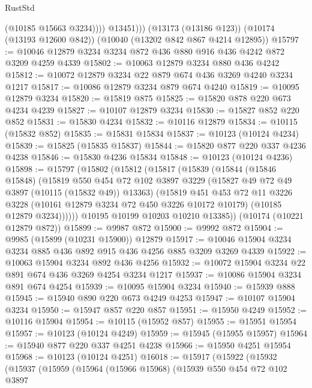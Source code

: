 \begin{lexlean}{RustStd}
\begin{coremodule}
                (@10185 @15663 @3234))))
          @13451)))
    (@13173 (@13186 @123))
    (@10174 (@13193 @12600 @842))
    (@10040 (@13202 @842 @867 @4214 @12895))
@15797 := @10046 @12879 @3234 @3234 @872 @436 @880 @916 @436 @4242 @872 @3209 @4259 @4339
@15802 := @10063 @12879 @3234 @880 @436 @4242
@15812 := @10072 @12879 @3234 @22 @879 @674 @436 @3269 @4240 @3234 @1217
@15817 := @10086 @12879 @3234 @879 @674 @4240
@15819 := @10095 @12879 @3234
@15820 := @15819 @875
@15825 := @15820 @878 @220 @673 @4234 @4239
@15827 := @10107 @12879 @3234
@15830 := @15827 @852 @220 @852
@15831 := @15830 @4234
@15832 := @10116 @12879
@15834 := @10115 (@15832 @852)
@15835 := @15831 @15834
@15837 := @10123 (@10124 @4234)
@15839 := @15825 (@15835 @15837)
@15844 := @15820 @877 @220 @337 @4236 @4238
@15846 := @15830 @4236 @15834
@15848 := @10123 (@10124 @4236)
@15898 := @15797
    (@15802
      (@15812
        (@15817
          (@15839
            (@15844
              (@15846 @15848)
              (@15819
                @550
                @454
                @72
                @102
                @3897
                @3229
                (@15827 @49 @72 @49 @3897 (@10115 (@15832 @49)) @13363)
                (@15819
                  @451
                  @453
                  @72
                  @11
                  @3226
                  @3228
                  (@10161 @12879 @3234 @72 @450 @3226 @10172 @10179)
                  (@10185 @12879 @3234))))))
        @10195
        @10199
        @10203
        @10210
        @13385))
    (@10174 (@10221 @12879 @872))
@15899 := @9987 @872
@15900 := @9992 @872
@15904 := @9985 (@15899 (@10231 @15900)) @12879
@15917 := @10046 @15904 @3234 @3234 @885 @436 @892 @915 @436 @4256 @885 @3209 @3269 @4339
@15922 := @10063 @15904 @3234 @892 @436 @4256
@15932 := @10072 @15904 @3234 @22 @891 @674 @436 @3269 @4254 @3234 @1217
@15937 := @10086 @15904 @3234 @891 @674 @4254
@15939 := @10095 @15904 @3234
@15940 := @15939 @888
@15945 := @15940 @890 @220 @673 @4249 @4253
@15947 := @10107 @15904 @3234
@15950 := @15947 @857 @220 @857
@15951 := @15950 @4249
@15952 := @10116 @15904
@15954 := @10115 (@15952 @857)
@15955 := @15951 @15954
@15957 := @10123 (@10124 @4249)
@15959 := @15945 (@15955 @15957)
@15964 := @15940 @877 @220 @337 @4251 @4238
@15966 := @15950 @4251 @15954
@15968 := @10123 (@10124 @4251)
@16018 := @15917
    (@15922
      (@15932
        (@15937
          (@15959
            (@15964
              (@15966 @15968)
              (@15939
                @550
                @454
                @72
                @102
                @3897

\end{coremodule}
\end{lexlean}
